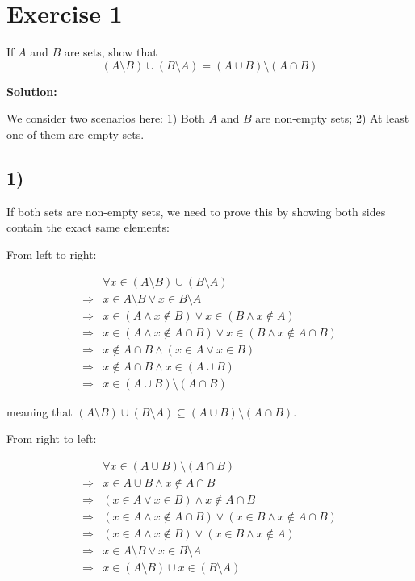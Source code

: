 \documentclass{article}
\begin{document}
\section*{Exercise 1}

If $A$ and $B$ are sets, show that
$$
(A \setminus B) \cup (B \setminus A) = (A \cup B) \setminus (A \cap B)
$$

\textbf{Solution:}

We consider two scenarios here: 1) Both $A$ and $B$ are non-empty sets; 2) At least one of them are empty sets.

\subsection*{1)}

If both sets are non-empty sets, we need to prove this by showing both sides contain the exact same elements:

From left to right:

\begin{align*}
& \forall x \in (A \setminus B) \cup (B \setminus A) \\
\Rightarrow & x \in A \setminus B \lor x \in B \setminus A \\
\Rightarrow & x \in (A \land x \notin B) \lor x \in (B \land x \notin A) \\
\Rightarrow & x \in (A \land x \notin A \cap B) \lor x \in (B \land x \notin A \cap B) \\
\Rightarrow & x \notin A \cap B \land (x \in A \lor x \in B) \\
\Rightarrow & x \notin A \cap B \land x \in (A \cup B) \\
\Rightarrow & x \in (A \cup B) \setminus (A \cap B)
\end{align*}

meaning that $(A \setminus B) \cup (B \setminus A) \subseteq (A \cup B) \setminus (A \cap B)$.

From right to left:

\begin{align*}
& \forall x \in (A \cup B) \setminus (A \cap B) \\
\Rightarrow & x \in A \cup B \land x \notin A \cap B \\
\Rightarrow & (x \in A \lor x \in B) \land x \notin A \cap B \\
\Rightarrow & (x \in A \land x \notin A \cap B) \lor (x \in B \land x \notin A \cap B) \\
\Rightarrow & (x \in A \land x \notin B) \lor (x \in B \land x \notin A) \\
\Rightarrow & x \in A \setminus B \lor x \in B \setminus A \\
\Rightarrow & x \in (A \setminus B) \cup x \in (B \setminus A)
\end{align*}
\end{document}
